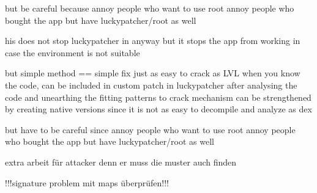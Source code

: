 but be careful because
annoy people who want to use root
annoy people who bought the app but have luckypatcher/root as well

his does not stop luckypatcher in anyway but it stops the app from working in case the environment is not suitable

but simple method == simple fix
just as easy to crack as LVL when you know the code, can be included in custom patch in luckypatcher after analysing the code and unearthing the fitting patterns to crack
mechanism can be strengthened by creating native versions since it is not as easy to decompile and analyze as dex

but have to be careful since
annoy people who want to use root
annoy people who bought the app but have luckypatcher/root as well

extra arbeit für attacker denn er muss die muster auch finden

!!!signature problem  mit maps überprüfen!!!
